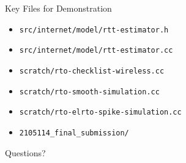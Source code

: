 \documentclass[aspectratio=169]{beamer}
\begin{document}
\begin{frame}{Key Files for Demonstration}
  \begin{itemize}
    \item \texttt{src/internet/model/rtt-estimator.h}
    \item \texttt{src/internet/model/rtt-estimator.cc}
    \item \texttt{scratch/rto-checklist-wireless.cc}
    \item \texttt{scratch/rto-smooth-simulation.cc}
    \item \texttt{scratch/rto-elrto-spike-simulation.cc}
    \item \texttt{2105114\_final\_submission/}
  \end{itemize}

  \vspace{0.4cm}
  \centering
  \Large Questions?
\end{frame}
\end{document}
